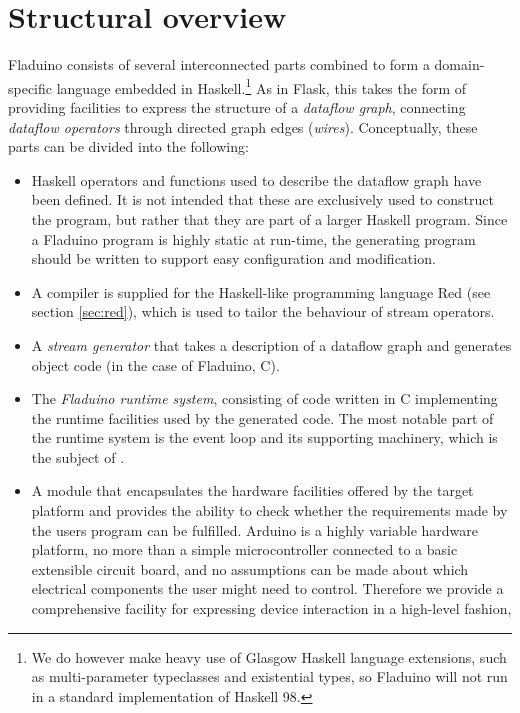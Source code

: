 \documentclass[a4paper, oneside, final]{memoir}
\let\Fref\undefined
\begin{document}
\section{Structural overview}

Fladuino consists of several interconnected parts combined to form a
domain-specific language embedded in Haskell.\footnote{We do however
  make heavy use of Glasgow Haskell language extensions, such as
  multi-parameter typeclasses and existential types, so Fladuino will
  not run in a standard implementation of Haskell 98.}  As in Flask,
this takes the form of providing facilities to express the structure
of a \textit{dataflow graph}, connecting \textit{dataflow operators}
through directed graph edges (\textit{wires}).  Conceptually, these
parts can be divided into the following:

\begin{itemize}
\item Haskell operators and functions used to describe the dataflow
  graph have been defined.  It is not intended that these are
  exclusively used to construct the program, but rather that they are
  part of a larger Haskell program.  Since a Fladuino program is
  highly static at run-time, the generating program should be written
  to support easy configuration and modification.
\item A compiler is supplied for the Haskell-like programming language
  Red (see section \ref{sec:red}), which is used to tailor the
  behaviour of stream operators.
\item A \textit{stream generator} that takes a description of a
  dataflow graph and generates object code (in the case of Fladuino,
  C).
\item The \textit{Fladuino runtime system}, consisting of code written
  in C implementing the runtime facilities used by the generated code.
  The most notable part of the runtime system is the event loop and
  its supporting machinery, which is the subject of
  \Fref{sec:dataflowevaluationstrategy}.
\item A module that encapsulates the hardware facilities offered by
  the target platform and provides the ability to check whether the
  requirements made by the users program can be fulfilled.  Arduino is
  a highly variable hardware platform, no more than a simple
  microcontroller connected to a basic extensible circuit board, and
  no assumptions can be made about which electrical components the
  user might need to control.  Therefore we provide a comprehensive
  facility for expressing device interaction in a high-level fashion,

\end{itemize}
\end{document}
